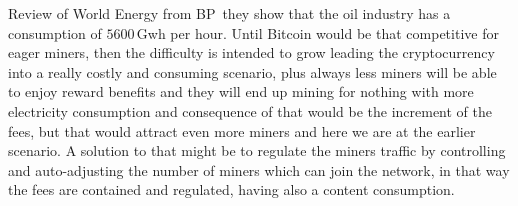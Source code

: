 \documentclass[USenglish]{uit-thesis}
\begin{document}
Review of World Energy from BP\,\cite{BPSRWE2016}
they show that the oil industry has a consumption
of $5600$\,Gwh per hour. Until Bitcoin
would be that competitive for eager miners, then
the difficulty is intended to grow leading
the cryptocurrency into a really costly and
consuming scenario, plus always less miners
will be able to enjoy reward benefits and they will
end up mining for nothing with more
electricity consumption and consequence of that
would be the increment of the fees, but that would
attract even more miners and here we are at the earlier
scenario. A solution to that might be to regulate
the miners traffic
by controlling and auto-adjusting
the number of miners which
can join the network, in
that way the fees are contained and
regulated, having also a content consumption.

\end{document}
